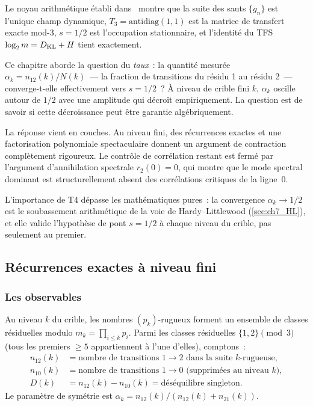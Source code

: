 \documentclass[12pt,a4paper]{article}
\begin{document}
Le noyau arithmétique établi dans~\cite{companion_M1,companion_M2}
montre que la suite des sauts $\{g_n\}$ est l'unique champ dynamique,
$T_3 = \mathrm{antidiag}(1,1)$ est la matrice de transfert exacte
mod-3, $s = 1/2$ est l'occupation stationnaire, et l'identité du TFS
$\log_2 m = D_{\mathrm{KL}} + H$ tient exactement.

Ce chapitre aborde la question du \emph{taux}~: la quantité mesurée
$\alpha_k = n_{12}(k) / N(k)$~--- la fraction de transitions du résidu
1 au résidu 2~--- converge-t-elle effectivement vers $s = 1/2$~?
À niveau de crible fini $k$, $\alpha_k$ oscille autour de $1/2$ avec
une amplitude qui décroît empiriquement. La question est de savoir si
cette décroissance peut être garantie algébriquement.

La réponse vient en couches. Au niveau fini, des récurrences exactes
et une factorisation polynomiale spectaculaire donnent un argument
de contraction complètement rigoureux. Le contrôle de corrélation
restant est fermé par l'argument d'annihilation spectrale $r_2(0) = 0$,
qui montre que le mode spectral dominant est structurellement absent
des corrélations critiques de la ligne~$0$.

L'importance de T4 dépasse les mathématiques pures~: la convergence
$\alpha_k \to 1/2$ est le soubassement arithmétique de la voie de
Hardy--Littlewood (\cref{sec:ch7_HL}), et elle valide l'hypothèse de
pont $s = 1/2$ à chaque niveau du crible, pas seulement au premier.

\subsection{Récurrences exactes à niveau fini}
\label{sec:ch7_recurrence}

\subsubsection{Les observables}

Au niveau $k$ du crible, les nombres $(p_k)$-rugueux forment un
ensemble de classes résiduelles modulo $m_k = \prod_{i \leq k} p_i$.
Parmi les classes résiduelles $\{1, 2\} \pmod{3}$ (tous les premiers
$\geq 5$ appartiennent à l'une d'elles), comptons~:
\begin{align}
  n_{12}(k) &= \text{nombre de transitions } 1 \to 2 \text{ dans la suite } k\text{-rugueuse}, \\
  n_{10}(k) &= \text{nombre de transitions } 1 \to 0 \text{ (supprimées au niveau } k\text{)}, \\
  D(k)      &= n_{12}(k) - n_{10}(k) = \text{déséquilibre singleton}.
\end{align}
Le paramètre de symétrie est $\alpha_k = n_{12}(k) / (n_{12}(k) + n_{21}(k))$.
\end{document}
